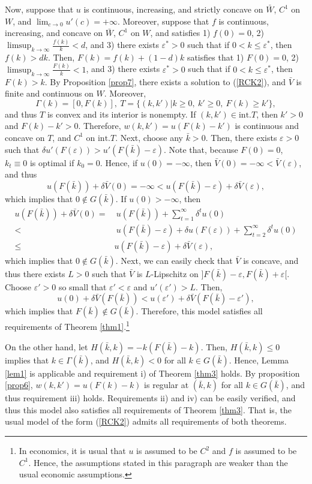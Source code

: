 \documentclass[a4paper,12pt]{article}
\theoremstyle{definition}
\begin{document}
Now, suppose that $u$ is continuous, increasing, and strictly concave on $\bar{W}$, $C^1$ on $W$, and $\lim_{c\to 0}u'(c)=+\infty$. Moreover, suppose that $f$ is continuous, increasing, and concave on $\bar{W}$, $C^1$ on $W$, and satisfies 1) $f(0)=0$, 2) $\limsup_{k\to \infty}\frac{f(k)}{k}<d$, and 3) there exists $\varepsilon^*>0$ such that if $0<k\le \varepsilon^*$, then $f(k)>dk$. Then, $F(k)=f(k)+(1-d)k$ satisfies that 1) $F(0)=0$, 2) $\limsup_{k\to \infty}\frac{F(k)}{k}<1$, and 3) there exists $\varepsilon^*>0$ such that if $0<k\le \varepsilon^*$, then $F(k)>k$. By Proposition \ref{prop7}, there exists a solution to (\ref{RCK2}), and $\bar{V}$ is finite and continuous on $W$. Moreover,
\[\Gamma(k)=[0,F(k)],\ T=\{(k,k')|k\ge 0,\ k'\ge 0,\ F(k)\ge k'\},\]
and thus $T$ is convex and its interior is nonempty. If $(k,k')\in \mbox{int.}T$, then $k'>0$ and $F(k)-k'>0$. Therefore, $w(k,k')=u(F(k)-k')$ is continuous and concave on $T$, and $C^1$ on $\mbox{int.}T$. Next, choose any $\bar{k}>0$. Then, there exists $\varepsilon>0$ such that $\delta u'(F(\varepsilon))>u'(F(\bar{k})-\varepsilon)$. Note that, because $F(0)=0$, $k_t\equiv 0$ is optimal if $k_0=0$. Hence, if $u(0)=-\infty$, then $\bar{V}(0)=-\infty<\bar{V}(\varepsilon)$, and thus
\[u(F(\bar{k}))+\delta\bar{V}(0)=-\infty<u(F(\bar{k})-\varepsilon)+\delta \bar{V}(\varepsilon),\]
which implies that $0\notin G(\bar{k})$. If $u(0)>-\infty$, then
\begin{align*}
u(F(\bar{k}))+\delta \bar{V}(0)=&~u(F(\bar{k}))+\sum_{t=1}^{\infty}\delta^tu(0)\\
<&~u(F(\bar{k})-\varepsilon)+\delta u(F(\varepsilon))+\sum_{t=2}^{\infty}\delta^tu(0)\\
\le& u(F(\bar{k})-\varepsilon)+\delta \bar{V}(\varepsilon),
\end{align*}
which implies that $0\notin G(\bar{k})$. Next, we can easily check that $\bar{V}$ is concave, and thus there exists $L>0$ such that $\bar{V}$ is $L$-Lipschitz on $]F(\bar{k})-\varepsilon,F(\bar{k})+\varepsilon[$. Choose $\varepsilon'>0$ so small that $\varepsilon'<\varepsilon$ and $u'(\varepsilon')>L$. Then,
\[u(0)+\delta \bar{V}(F(\bar{k}))<u(\varepsilon')+\delta \bar{V}(F(\bar{k})-\varepsilon'),\]
which implies that $F(\bar{k})\notin G(\bar{k})$. Therefore, this model satisfies all requirements of Theorem \ref{thm1}.\footnote{In economics, it is usual that $u$ is assumed to be $C^2$ and $f$ is assumed to be $C^1$. Hence, the assumptions stated in this paragraph are weaker than the usual economic assumptions.}

On the other hand, let $H(\bar{k},k)=-k(F(\bar{k})-k)$. Then, $H(\bar{k},k)\le 0$ implies that $k\in \Gamma(\bar{k})$, and $H(\bar{k},k)<0$ for all $k\in G(\bar{k})$. Hence, Lemma \ref{lem1} is applicable and requirement i) of Theorem \ref{thm3} holds. By proposition \ref{prop6}, $w(k,k')=u(F(k)-k)$ is regular at $(\bar{k},k)$ for all $k\in G(\bar{k})$, and thus requirement iii) holds. Requirements ii) and iv) can be easily verified, and thus this model also satisfies all requirements of Theorem \ref{thm3}. That is, the usual model of the form (\ref{RCK2}) admits all requirements of both theorems.
\end{document}
